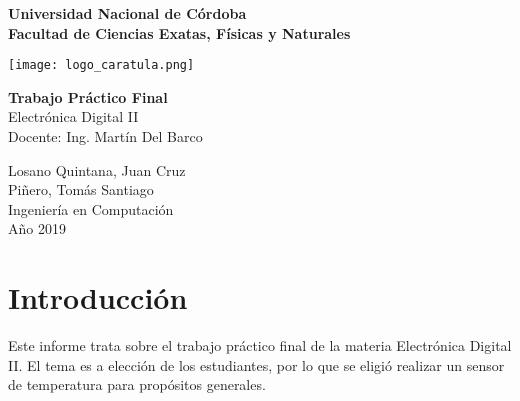 \documentclass[12pt,a4paper]{article}
\renewcommand{\baselinestretch}{1} %
\begin{document}
\begin{titlepage}
    \begin{center}
        \vspace*{1cm}
        
        \Large
        \textbf{Universidad Nacional de Córdoba\\
        		Facultad de Ciencias Exatas, Físicas y Naturales}
        
        \vspace{0.5cm}
        \texttt{[image: logo\_caratula.png]}
        
        \vspace{1.5cm}
        
        \textbf{Trabajo Práctico Final}\\
        Electrónica Digital II\\
        Docente: Ing. Martín Del Barco
        
        \vfill  
        
        \vspace{0.8cm}
        

        
        \Large
        Losano Quintana, Juan Cruz\\
        Piñero, Tomás Santiago\\
        Ingeniería en Computación\\
        Año 2019\\
        
        
    \end{center}
\end{titlepage}


\setcounter{secnumdepth}{1}
\setcounter{tocdepth}{4}
\tableofcontents


\newpage
\renewcommand{\baselinestretch}{1}
\setlength{\parskip}{0.5em}

\section{Introducción}
	Este informe trata sobre el trabajo práctico final de la materia Electrónica Digital II. El tema es a elección de los estudiantes, por lo que se eligió realizar un sensor de temperatura para propósitos generales.
	
\end{document}
